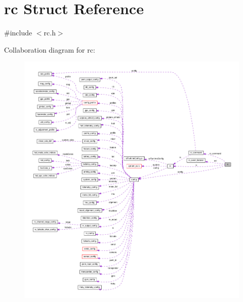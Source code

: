 \hypertarget{structrc}{\section{rc Struct Reference}
\label{structrc}
}


{\ttfamily \#include $<$rc.\+h$>$}



Collaboration diagram for rc\+:\nopagebreak
\begin{figure}[H]
\begin{center}
\leavevmode
\includegraphics[width=350pt]{structrc__coll__graph}
\end{center}
\end{figure}
